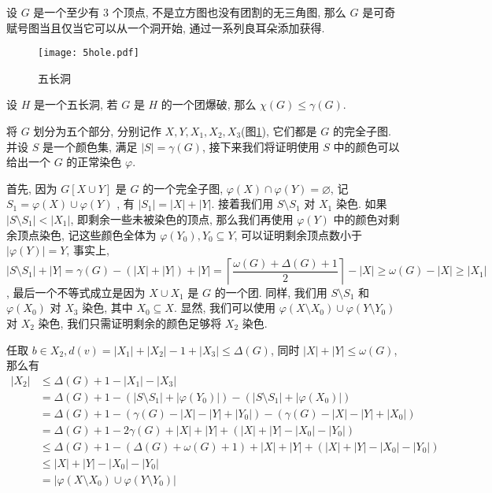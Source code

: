 \documentclass[12pt,a4paper]{article}%
\begin{document}
\begin{thm}\label{triangle_free}
    设 $G$ 是一个至少有 $3$ 个顶点, 不是立方图也没有团割的无三角图, 那么 $G$ 是可奇赋号图当且仅当它可以从一个洞开始, 通过一系列良耳朵添加获得.
\end{thm}

\begin{figure}[h]
\begin{center}
\texttt{[image: 5hole.pdf]}
\caption{五长洞}
\label{5hole_pic}
\end{center}
\end{figure}

\begin{thm}\label{thm41}
    设 $H$ 是一个五长洞, 若 $G$ 是 $H$ 的一个团爆破, 那么 $\chi(G) \leq \gamma(G)$.
\end{thm}
\begin{pf}
    将 $G$ 划分为五个部分, 分别记作 $X,Y,X_1,X_2,X_3$(图\ref{5hole_pic}), 它们都是 $G$ 的完全子图. 并设 $S$ 是一个颜色集, 满足 $|S| = \gamma(G)$, 接下来我们将证明使用 $S$ 中的颜色可以给出一个 $G$ 的正常染色 $\varphi$.

    首先, 因为 $G[X \cup Y]$ 是 $G$ 的一个完全子图, $\varphi(X) \cap \varphi(Y) = \varnothing$, 记 $S_1 = \varphi(X) \cup \varphi(Y)$ , 有 $|S_1| = |X| + |Y|$. 接着我们用 $S \setminus S_1$ 对 $X_1$ 染色. 如果$|S \setminus S_1| < |X_1| $, 即剩余一些未被染色的顶点, 那么我们再使用 $\varphi(Y)$ 中的颜色对剩余顶点染色, 记这些颜色全体为 $\varphi(Y_0), Y_0 \subseteq Y$, 可以证明剩余顶点数小于$ |\varphi(Y)| = Y$, 事实上, $|S \setminus S_1| + |Y| = \gamma(G) - (|X| + |Y|) + |Y| = \left\lceil \dfrac{\omega (G) + \Delta (G) + 1}{2}  \right\rceil - |X| \geq \omega(G) - |X| \geq |X_1|$, 最后一个不等式成立是因为 $X \cup X_1$ 是 $G$ 的一个团. 同样, 我们用  $S \setminus S_1$ 和 $\varphi(X_0)$ 对 $X_3$ 染色, 其中 $X_0 \subseteq X$. 显然, 我们可以使用 $\varphi(X \setminus X_0) \cup \varphi(Y \setminus Y_0)$ 对 $X_2$ 染色, 我们只需证明剩余的颜色足够将 $X_2$ 染色.

    任取 $b \in X_2, d(v) = |X_1| + |X_2| -1 + |X_3| \leq \Delta(G)$, 同时 $|X| + |Y| \leq \omega(G)$, 那么有
    \begin{align*}
        |X_2|   &\leq \Delta(G)+1-|X_1|- |X_3|\\
                &= \Delta(G)+1-(|S\setminus  S_1|+|\varphi(Y_0)|)-(|S\setminus  S_1|+|\varphi(X_0)|)\\
                &= \Delta(G)+1-(\gamma(G)-|X|-|Y|+|Y_0|)-(\gamma(G)-|X|-|Y|+|X_0|)\\
                &= \Delta(G)+1-2\gamma(G)+|X|+|Y| +(|X|+|Y| -|X_0|-|Y_0|)\\
                &\leq \Delta(G)+1-(\Delta(G)+\omega(G)+1)+|X|+|Y| +(|X|+|Y| -|X_0|-|Y_0|)\\
                &\leq |X|+|Y| -|X_0|-|Y_0|\\
                &= |\varphi(X\setminus X_0)\cup \varphi(Y\setminus Y_0)|
    \end{align*}


\end{pf}
\end{document}
